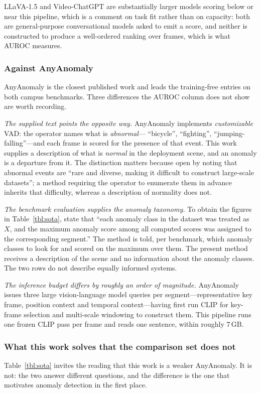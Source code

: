 \documentclass[a4paper,fleqn]{cas-sc}
\begin{document}
LLaVA-1.5 and Video-ChatGPT are substantially larger models scoring below or
near this pipeline, which is a comment on task fit rather than on capacity: both
are general-purpose conversational models asked to emit a score, and neither is
constructed to produce a well-ordered ranking over frames, which is what AUROC
measures.

\subsubsection{Against AnyAnomaly}
AnyAnomaly \citep{anyanomaly2025} is the closest published work and leads the training-free entries on both campus benchmarks. Three differences the AUROC column does not show are worth
recording.

\emph{The supplied text points the opposite way.} AnyAnomaly implements
\emph{customizable} VAD: the operator names what is \emph{abnormal}---
``bicycle'', ``fighting'', ``jumping-falling''---and each frame is scored for the
presence of that event. This work supplies a description of what is
\emph{normal} in the deployment scene, and an anomaly is a departure from it.
The distinction matters because \citet{anyanomaly2025} open by noting that
abnormal events are ``rare and diverse, making it difficult to construct
large-scale datasets''; a method requiring the operator to enumerate them in
advance inherits that difficulty, whereas a description of normality does not.

\emph{The benchmark evaluation supplies the anomaly taxonomy.} To obtain the
figures in Table~\ref{tbl:sota}, \citet{anyanomaly2025} state that ``each
anomaly class in the dataset was treated as $X$, and the maximum anomaly score
among all computed scores was assigned to the corresponding segment.'' The
method is told, per benchmark, which anomaly classes to look for and scored on
the maximum over them. The present method receives a description of the scene
and no information about the anomaly classes. The two rows do not describe
equally informed systems.

\emph{The inference budget differs by roughly an order of magnitude.}
AnyAnomaly issues three large vision-language model queries per
segment---representative key frame, position context and temporal
context---having first run CLIP for key-frame selection and multi-scale
windowing to construct them. This pipeline runs one frozen CLIP pass per frame
and reads one sentence, within roughly $7$\,GB.

\subsubsection{What this work solves that the comparison set does not}
\label{sec:res-openset}
Table~\ref{tbl:sota} invites the reading that this work is a weaker AnyAnomaly.
It is not: the two answer different questions, and the difference is the one that
motivates anomaly detection in the first place.
\end{document}
